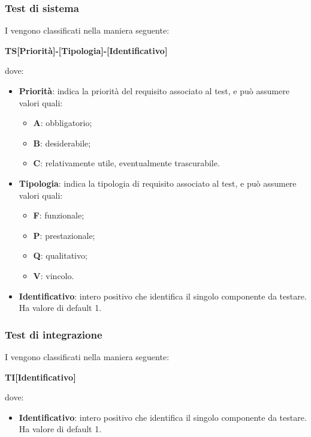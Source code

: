 \documentclass[]{article}
\begin{document}
		\subsubsection{Test di sistema}
		I  vengono classificati nella maniera seguente:
		\begin{center}
			\textbf{TS[Priorità]-[Tipologia]-[Identificativo]}
		\end{center}		 
		dove:\\
		\begin{itemize}
			\item \textbf{Priorità}: indica la priorità del requisito associato al test, e può assumere valori quali:
			\begin{itemize}
				\item \textbf{A}: obbligatorio;
				\item \textbf{B}: desiderabile;
				\item \textbf{C}: relativamente utile, eventualmente trascurabile.
			\end{itemize}
			\item \textbf{Tipologia}: indica la tipologia di requisito associato al test, e può assumere valori quali:
			\begin{itemize}
				\item \textbf{F}: funzionale;
				\item \textbf{P}: prestazionale;
				\item \textbf{Q}: qualitativo;
				\item \textbf{V}: vincolo.
			\end{itemize}
			\item \textbf{Identificativo}: intero positivo che identifica il singolo componente da testare. Ha valore di default 1.
		\end{itemize}
		 
		\subsubsection{Test di integrazione}
		I  vengono classificati nella maniera seguente:
		\begin{center}
			\textbf{TI[Identificativo]}
		\end{center}	
		dove:\\
		\begin{itemize}
			\item \textbf{Identificativo}: intero positivo che identifica il singolo componente da testare. Ha valore di default 1.
		\end{itemize}		 
		
\end{document}
